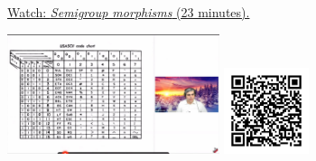 
\begin{minipage}{10cm}
    \href{https://act4e-spring21.netlify.app/videos/spring2021-morphisms:morphisms:semigroup-morphisms.html}{Watch: \emph{Semigroup morphisms} (23 minutes).}
        
    \href{https://act4e-spring21.netlify.app/videos/spring2021-morphisms:morphisms:semigroup-morphisms.html}{\includegraphics[height=3.5cm]{spring2021-morphisms:morphisms:semigroup-morphisms/thumbnails.jpg}}
    \href{https://act4e-spring21.netlify.app/videos/spring2021-morphisms:morphisms:semigroup-morphisms.html}{\includegraphics[height=2.5cm]{spring2021-morphisms:morphisms:semigroup-morphisms/qrcode.png}}
\end{minipage}

